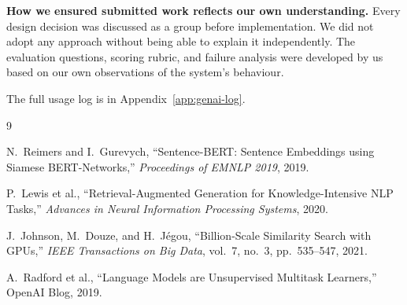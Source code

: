 \documentclass[10pt,conference]{IEEEtran}
\begin{document}
\textbf{How we ensured submitted work reflects our own understanding.}
Every design decision was discussed as a group before implementation.
We did not adopt any approach without being able to explain it
independently. The evaluation questions, scoring rubric, and failure
analysis were developed by us based on our own observations of the
system's behaviour.

The full usage log is in Appendix~\ref{app:genai-log}.

\appendices


\begin{thebibliography}{9}

N.~Reimers and I.~Gurevych,
``Sentence-BERT: Sentence Embeddings using Siamese BERT-Networks,''
\textit{Proceedings of EMNLP 2019}, 2019.

P.~Lewis et al.,
``Retrieval-Augmented Generation for Knowledge-Intensive NLP Tasks,''
\textit{Advances in Neural Information Processing Systems}, 2020.

J.~Johnson, M.~Douze, and H.~J\'{e}gou,
``Billion-Scale Similarity Search with GPUs,''
\textit{IEEE Transactions on Big Data}, vol.~7, no.~3, pp.~535--547,
2021.

A.~Radford et al.,
``Language Models are Unsupervised Multitask Learners,''
OpenAI Blog, 2019.

\end{thebibliography}

\appendices
\end{document}
